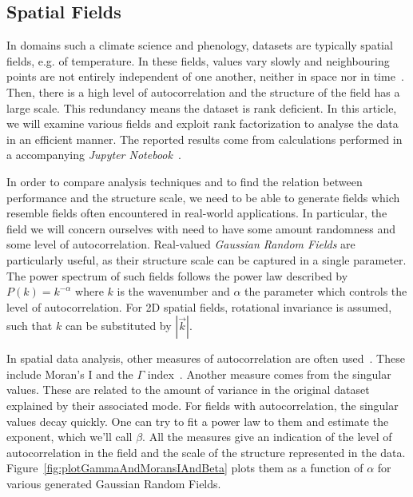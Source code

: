 \documentclass{acm_proc_article-sp}
\begin{document}
\subsection{Spatial Fields}
\label{sec:Introduction Spatial Fields}

In domains such a climate science and phenology, datasets are typically spatial fields, e.g. of temperature. In these fields, values vary slowly and neighbouring points are not entirely independent of one another, neither in space nor in time~\cite{Eshel2011}. Then, there is a high level of autocorrelation and the structure of the field has a large scale. This redundancy means the dataset is rank deficient. In this article, we will examine various fields and exploit rank factorization to analyse the data in an efficient manner. The reported results come from calculations performed in a accompanying \textit{Jupyter Notebook}~\cite{RefNeeded}.

In order to compare analysis techniques and to find the relation between performance and the structure scale, we need to be able to generate fields which resemble fields often encountered in real-world applications. In particular, the field we will concern ourselves with need to have some amount randomness and some level of autocorrelation. Real-valued \textit{Gaussian Random Fields} are particularly useful, as their structure scale can be captured in a single parameter. The power spectrum of such fields follows the power law described by $P(k) = k^{-\alpha}$ where $k$ is the wavenumber and $\alpha$ the parameter which controls the level of autocorrelation. For 2D spatial fields, rotational invariance is assumed, such that $k$ can be substituted by $|\vec{k}|$.

In spatial data analysis, other measures of autocorrelation are often used~\cite{Eshel2011, Storch1999}. These include Moran's I and the $\Gamma$ index~\cite{Moran1950, Hubert1981, PySAL}. Another measure comes from the singular values. These are related to the amount of variance in the original dataset explained by their associated mode. For fields with autocorrelation, the singular values decay quickly. One can try to fit a power law to them and estimate the exponent, which we'll call $\beta$. %
All the measures give an indication of the level of autocorrelation in the field and the scale of the structure represented in the data. Figure~\ref{fig:plotGammaAndMoransIAndBeta} plots them as a function of $\alpha$ for various generated Gaussian Random Fields.
\end{document}
